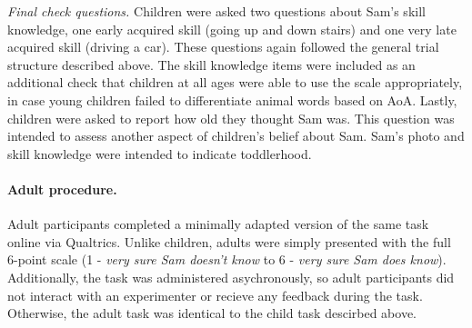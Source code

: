 \documentclass[10pt, letterpaper]{article}
\begin{document}
\emph{Final check questions.} Children were asked two questions about
Sam's skill knowledge, one early acquired skill (going up and down
stairs) and one very late acquired skill (driving a car). These
questions again followed the general trial structure described above.
The skill knowledge items were included as an additional check that
children at all ages were able to use the scale appropriately, in case
young children failed to differentiate animal words based on AoA.
Lastly, children were asked to report how old they thought Sam was. This
question was intended to assess another aspect of children's belief
about Sam. Sam's photo and skill knowledge were intended to indicate
toddlerhood.

\hypertarget{adult-procedure.}{%
\paragraph{Adult procedure.}\label{adult-procedure.}}

Adult participants completed a minimally adapted version of the same
task online via Qualtrics. Unlike children, adults were simply presented
with the full 6-point scale (1 - \emph{very sure Sam doesn't know} to 6
- \emph{very sure Sam does know}). Additionally, the task was
administered asychronously, so adult participants did not interact with
an experimenter or recieve any feedback during the task. Otherwise, the
adult task was identical to the child task descirbed above.
\end{document}
